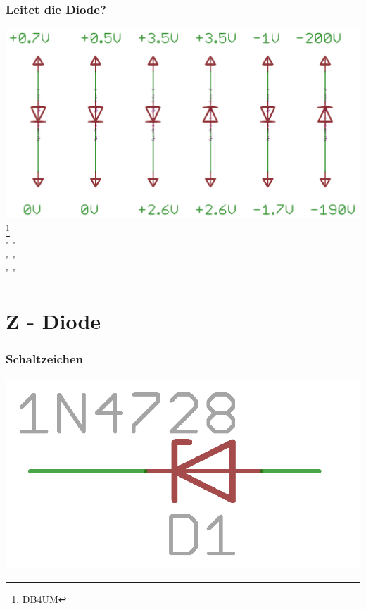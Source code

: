\begin{frame}
    \frametitle{Leitet die Diode?}
    \begin{center}
        \includegraphics[width=1\textwidth]{e12/Leit_Diode.png}         \footnote{\tiny DB4UM} \\ " "\\ " " \\ " "
	\end{center}
\end{frame}


\section*{Z - Diode}

\begin{frame}
    \frametitle{Schaltzeichen}
    \begin{center}
        \includegraphics[width=.8\textwidth]{e12/z-diode.png}
	\end{center}
\end{frame}


